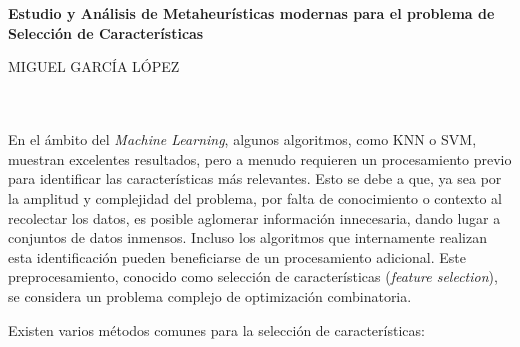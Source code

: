 \chapter*{}






\cleardoublepage
\thispagestyle{empty}

\begin{center}
       {\large\bfseries Estudio y Análisis de Metaheurísticas modernas para el problema de Selección de Características}\\
\end{center}
\begin{center}
       MIGUEL GARCÍA LÓPEZ\\
\end{center}

\\

\vspace{0.7cm}
\\

En el ámbito del \textit{Machine Learning}, algunos algoritmos, como KNN o SVM, muestran excelentes resultados, pero a menudo requieren un procesamiento previo para identificar las características más relevantes. Esto se debe a que, ya sea por la amplitud y complejidad del problema, por falta de conocimiento o contexto al recolectar los datos, es posible aglomerar información innecesaria, dando lugar a conjuntos de datos inmensos. Incluso los algoritmos que internamente realizan esta identificación pueden beneficiarse de un procesamiento adicional. Este preprocesamiento, conocido como selección de características (\textit{feature selection}), se considera un problema complejo de optimización combinatoria.

Existen varios métodos comunes para la selección de características:

